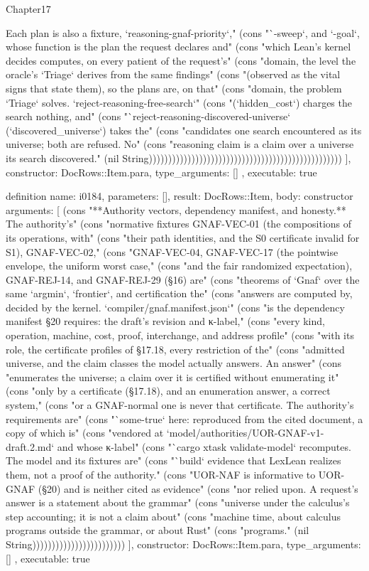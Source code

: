 \begin{lexlean}{Chapter17}
\begin{semanticmodule}
{{Each plan is also a fixture, `reasoning-gnaf-priority`," (cons "`-sweep`, and `-goal`, whose function is the plan the request declares and" (cons "which Lean's kernel decides computes, on every patient of the request's" (cons "domain, the level the oracle's `Triage` derives from the same findings" (cons "(observed as the vital signs that state them), so the plans are, on that" (cons "domain, the problem `Triage` solves. `reject-reasoning-free-search`" (cons "(`hidden_cost`) charges the search nothing, and" (cons "`reject-reasoning-discovered-universe` (`discovered_universe`) takes the" (cons "candidates one search encountered as its universe; both are refused. No" (cons "reasoning claim is a claim over a universe its search discovered." (nil String))))))))))))))))))))))))))))))))))))))))))))))))))
    ],
    constructor: DocRows::Item.para,
    type_arguments: []
  },
  executable: true
}

definition{
  name: i0184,
  parameters: [],
  result: DocRows::Item,
  body: constructor{
    arguments: [
      (cons "**Authority vectors, dependency manifest, and honesty.** The authority's" (cons "normative fixtures GNAF-VEC-01 (the compositions of its operations, with" (cons "their path identities, and the S0 certificate invalid for S1), GNAF-VEC-02," (cons "GNAF-VEC-04, GNAF-VEC-17 (the pointwise envelope, the uniform worst case," (cons "and the fair randomized expectation), GNAF-REJ-14, and GNAF-REJ-29 (§16) are" (cons "theorems of `Gnaf` over the same `argmin`, `frontier`, and certification the" (cons "answers are computed by, decided by the kernel. `compiler/gnaf.manifest.json`" (cons "is the dependency manifest §20 requires: the draft's revision and κ-label," (cons "every kind, operation, machine, cost, proof, interchange, and address profile" (cons "with its role, the certificate profiles of §17.18, every restriction of the" (cons "admitted universe, and the claim classes the model actually answers. An answer" (cons "enumerates the universe; a claim over it is certified without enumerating it" (cons "only by a certificate (§17.18), and an enumeration answer, a correct system," (cons "or a GNAF-normal one is never that certificate. The authority's requirements are" (cons "`some-true` here: reproduced from the cited document, a copy of which is" (cons "vendored at `model/authorities/UOR-GNAF-v1-draft.2.md` and whose κ-label" (cons "`cargo xtask validate-model` recomputes. The model and its fixtures are" (cons "`build` evidence that LexLean realizes them, not a proof of the authority." (cons "UOR-NAF is informative to UOR-GNAF (§20) and is neither cited as evidence" (cons "nor relied upon. A request's answer is a statement about the grammar" (cons "universe under the calculus's step accounting; it is not a claim about" (cons "machine time, about calculus programs outside the grammar, or about Rust" (cons "programs." (nil String))))))))))))))))))))))))
    ],
    constructor: DocRows::Item.para,
    type_arguments: []
  },
  executable: true
}


\end{semanticmodule}
\end{lexlean}
